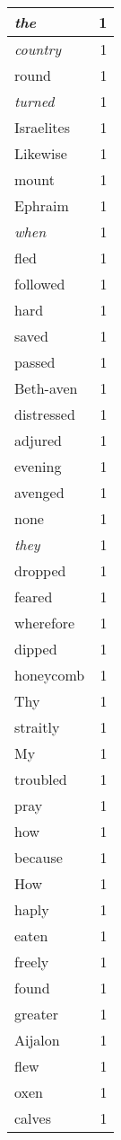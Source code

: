 \begin{center}
\begin{longtable}{l|r}
\emph{the} & 1 \\ \hline
\emph{country} & 1 \\ \hline
round & 1 \\ \hline
\emph{turned} & 1 \\ \hline
Israelites & 1 \\ \hline
Likewise & 1 \\ \hline
mount & 1 \\ \hline
Ephraim & 1 \\ \hline
\emph{when} & 1 \\ \hline
fled & 1 \\ \hline
followed & 1 \\ \hline
hard & 1 \\ \hline
saved & 1 \\ \hline
passed & 1 \\ \hline
Beth-aven & 1 \\ \hline
distressed & 1 \\ \hline
adjured & 1 \\ \hline
evening & 1 \\ \hline
avenged & 1 \\ \hline
none & 1 \\ \hline
\emph{they} & 1 \\ \hline
dropped & 1 \\ \hline
feared & 1 \\ \hline
wherefore & 1 \\ \hline
dipped & 1 \\ \hline
honeycomb & 1 \\ \hline
Thy & 1 \\ \hline
straitly & 1 \\ \hline
My & 1 \\ \hline
troubled & 1 \\ \hline
pray & 1 \\ \hline
how & 1 \\ \hline
because & 1 \\ \hline
How & 1 \\ \hline
haply & 1 \\ \hline
eaten & 1 \\ \hline
freely & 1 \\ \hline
found & 1 \\ \hline
greater & 1 \\ \hline
Aijalon & 1 \\ \hline
flew & 1 \\ \hline
oxen & 1 \\ \hline
calves & 1 \\ \hline

\end{longtable}
\end{center}
